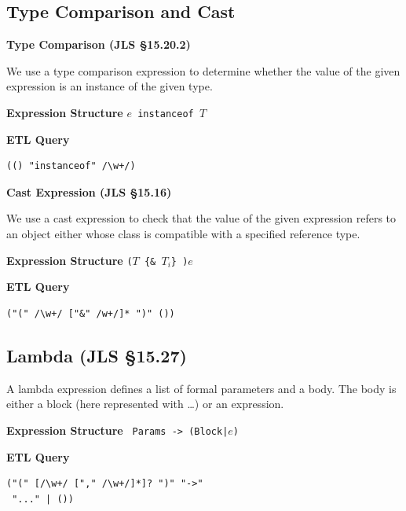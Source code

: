 \begin{chapterBody}
\subsection*{Type Comparison and Cast}

\noindent\textbf{Type Comparison (JLS \S15.20.2)}

We use a type comparison expression to determine whether the value of the given
expression is an instance of the given type.
\vspace{1em}

\begin{minipage}[t]{.45\linewidth}
\textbf{Expression Structure} \hfill\break
\texttt{$e$ {\color{bp-blue}instanceof} $T$}
\end{minipage}
\begin{minipage}[t]{.45\linewidth}
\textbf{ETL Query}
\begin{lstlisting}[language=etl]
(() "instanceof" /\w+/)
\end{lstlisting}
\end{minipage}

\noindent\textbf{Cast Expression (JLS \S15.16)}

We use a cast expression to check that the value of the given expression refers
to an object either whose class is compatible with a specified reference type.
\vspace{1em}

\begin{minipage}[t]{.45\linewidth}
\textbf{Expression Structure} \hfill\break
\texttt{{\color{bp-blue}(}$T$ \{{\color{bp-blue}\&} $T_i$\}
{\color{bp-blue})}$e$}
\end{minipage}
\begin{minipage}[t]{.45\linewidth}
\textbf{ETL Query}
\begin{lstlisting}[language=etl]
("(" /\w+/ ["&" /w+/]* ")" ())
\end{lstlisting}
\end{minipage}

\subsection*{Lambda (JLS \S15.27)}

A lambda expression defines a list of formal parameters and a body. The body
is either a block (here represented with \ldots) or an expression.
\vspace{1em}

\begin{minipage}[t]{.45\linewidth}
\textbf{Expression Structure} \hfill\break
\texttt{
Params {\color{bp-blue}->}
\hfill\break\hspace*{0.25em}
(Block|$e$)
}
\end{minipage}
\begin{minipage}[t]{.45\linewidth}
\textbf{ETL Query}
\begin{lstlisting}[language=etl]
("(" [/\w+/ ["," /\w+/]*]? ")" "->"
 "..." | ())
\end{lstlisting}
\end{minipage}


\end{chapterBody}
